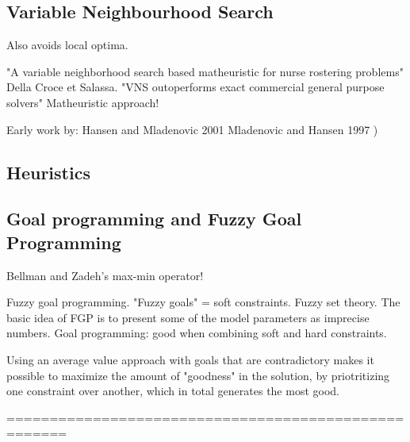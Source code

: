 \subsection{Variable Neighbourhood Search}

Also avoids local optima. 

"A variable neighborhood search based matheuristic for nurse rostering problems" Della Croce et Salassa. "VNS outoperforms exact commercial general purpose solvers"
Matheuristic approach!

Early work by:
Hansen  and  Mladenovic
2001
Mladenovic and Hansen
1997
)


\subsection{Heuristics}

\subsection{Goal programming and Fuzzy Goal Programming}
Bellman and Zadeh's max-min operator!

Fuzzy goal programming.  "Fuzzy goals" = soft constraints. Fuzzy set theory. The basic idea of FGP is to present some of the model parameters as imprecise numbers.
Goal programming: good when combining soft and hard constraints.

Using an average value approach with goals that are contradictory makes it possible to maximize the amount of "goodness" in the solution, by priotritizing one constraint over another, which in total generates the most good.


=====================================================

